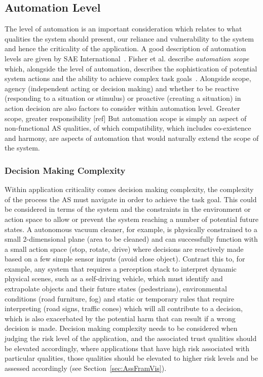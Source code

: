 \subsection{Automation Level} \label{sec:autlev}

The level of automation is an important consideration which relates to what qualities the system should present, our reliance and vulnerability to the system and hence the criticality of the application. A good description of automation levels are given by SAE International~\cite{SAEJ3016}. 
%
Fisher et al. describe \emph{automation scope} which, alongside the level of automation, describes the sophistication of potential system actions and the ability to achieve complex task goals~\cite{Fisher2021}. 
%
Alongside scope, agency (independent acting or decision making) and whether to be reactive (responding to a situation or stimulus) or proactive (creating a situation) in action decision are also factors to consider within automation level.
%
Greater scope, greater responsibility [ref]
%
%
But automation scope is simply an aspect of non-functional AS qualities, of which compatibility, which includes co-existence and harmony, are aspects of automation that would naturally extend the scope of the system. 


\subsubsection{Decision Making Complexity} \label{sec:appcrit-dec}

Within application criticality comes decision making complexity, the complexity of the process the AS must navigate in order to achieve the task goal. This could be considered in terms of the system and the constraints in the environment or action space to allow or prevent the system reaching a number of potential future states. A autonomous vacuum cleaner, for example, is physically constrained to a small 2-dimensional plane (area to be cleaned) and can successfully function with a small action space (stop, rotate, drive) where decisions are reactively made based on a few simple sensor inputs (avoid close object). 
%
Contrast this to, for example, any system that requires a perception stack to interpret dynamic physical scenes, such as a self-driving vehicle, which must identify and extrapolate objects and their future states (pedestrians), environmental conditions (road furniture, fog) and static or temporary rules that require interpreting (road signs, traffic cones) which will all contribute to a decision, which is also exacerbated by the potential harm that can result if a wrong decision is made. 
%
Decision making complexity needs to be considered when judging the risk level of the application, and the associated trust qualities should be elevated accordingly, where applications that have high risk associated with particular qualities, those qualities should be elevated to higher risk levels and be assessed accordingly (see Section~\ref{sec:AssFramVis}). 


